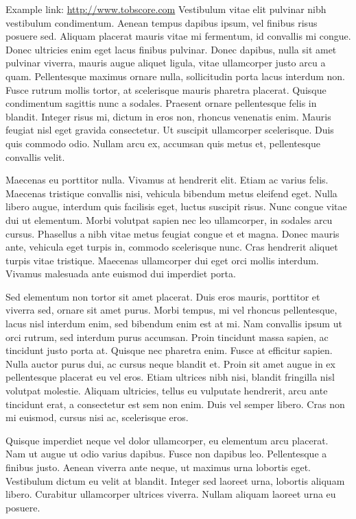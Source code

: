 Example link: \url{http://www.tobscore.com}
Vestibulum vitae elit pulvinar nibh vestibulum condimentum. Aenean tempus dapibus ipsum, vel finibus risus posuere sed. Aliquam placerat mauris vitae mi fermentum, id convallis mi congue. Donec ultricies enim eget lacus finibus pulvinar. Donec dapibus, nulla sit amet pulvinar viverra, mauris augue aliquet ligula, vitae ullamcorper justo arcu a quam. Pellentesque maximus ornare nulla, sollicitudin porta lacus interdum non. Fusce rutrum mollis tortor, at scelerisque mauris pharetra placerat. Quisque condimentum sagittis nunc a sodales. Praesent ornare pellentesque felis in blandit. Integer risus mi, dictum in eros non, rhoncus venenatis enim. Mauris feugiat nisl eget gravida consectetur. Ut suscipit ullamcorper scelerisque. Duis quis commodo odio. Nullam arcu ex, accumsan quis metus et, pellentesque convallis velit.

Maecenas eu porttitor nulla. Vivamus at hendrerit elit. Etiam ac varius felis. Maecenas tristique convallis nisi, vehicula bibendum metus eleifend eget. Nulla libero augue, interdum quis facilisis eget, luctus suscipit risus. Nunc congue vitae dui ut elementum. Morbi volutpat sapien nec leo ullamcorper, in sodales arcu cursus. Phasellus a nibh vitae metus feugiat congue et et magna. Donec mauris ante, vehicula eget turpis in, commodo scelerisque nunc. Cras hendrerit aliquet turpis vitae tristique. Maecenas ullamcorper dui eget orci mollis interdum. Vivamus malesuada ante euismod dui imperdiet porta.

Sed elementum non tortor sit amet placerat. Duis eros mauris, porttitor et viverra sed, ornare sit amet purus. Morbi tempus, mi vel rhoncus pellentesque, lacus nisl interdum enim, sed bibendum enim est at mi. Nam convallis ipsum ut orci rutrum, sed interdum purus accumsan. Proin tincidunt massa sapien, ac tincidunt justo porta at. Quisque nec pharetra enim. Fusce at efficitur sapien. Nulla auctor purus dui, ac cursus neque blandit et. Proin sit amet augue in ex pellentesque placerat eu vel eros. Etiam ultrices nibh nisi, blandit fringilla nisl volutpat molestie. Aliquam ultricies, tellus eu vulputate hendrerit, arcu ante tincidunt erat, a consectetur est sem non enim. Duis vel semper libero. Cras non mi euismod, cursus nisi ac, scelerisque eros.

Quisque imperdiet neque vel dolor ullamcorper, eu elementum arcu placerat. Nam ut augue ut odio varius dapibus. Fusce non dapibus leo. Pellentesque a finibus justo. Aenean viverra ante neque, ut maximus urna lobortis eget. Vestibulum dictum eu velit at blandit. Integer sed laoreet urna, lobortis aliquam libero. Curabitur ullamcorper ultrices viverra. Nullam aliquam laoreet urna eu posuere.
